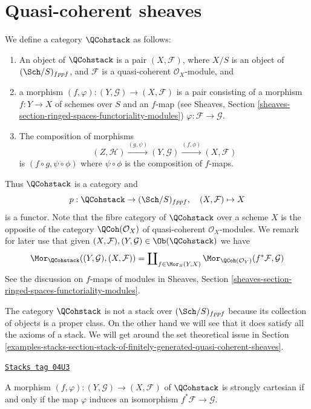 \section{Quasi-coherent sheaves}
\label{examples-stacks-section-stack-of-quasi-coherent-sheaves}
We define a category $\QCohstack$ as follows:
\begin{enumerate}
\item An object of $\QCohstack$ is a pair $(X, \mathcal{F})$,
where $X/S$ is an object of $(\Sch/S)_{fppf}$, and $\mathcal{F}$
is a quasi-coherent $\mathcal{O}_X$-module, and
\item a morphism $(f, \varphi) : (Y, \mathcal{G}) \to (X, \mathcal{F})$
is a pair consisting of a morphism $f : Y \to X$ of schemes over $S$
and an $f$-map (see
Sheaves, Section \ref{sheaves-section-ringed-spaces-functoriality-modules})
$\varphi : \mathcal{F} \to \mathcal{G}$.
\item The composition of morphisms
$$
(Z, \mathcal{H}) \xrightarrow{(g, \psi)}
(Y, \mathcal{G}) \xrightarrow{(f, \phi)} (X, \mathcal{F})
$$
is $(f \circ g, \psi \circ \phi)$ where $\psi \circ \phi$ is
the composition of $f$-maps.
\end{enumerate}
Thus $\QCohstack$ is a category and
$$
p : \QCohstack \to (\Sch/S)_{fppf},
\quad
(X, \mathcal{F}) \mapsto X
$$
is a functor. Note that the fibre category of $\QCohstack$ over
a scheme $X$ is the opposite of the category $\QCoh(\mathcal{O}_X)$
of quasi-coherent $\mathcal{O}_X$-modules.
We remark for later use that given
$(X, \mathcal{F}), (Y, \mathcal{G}) \in \Ob(\QCohstack)$
we have
\begin{equation}
\label{equation-morphisms-qcoh}
\Mor_{\QCohstack}((Y, \mathcal{G}), (X, \mathcal{F}))
=
\coprod\nolimits_{f \in \Mor_S(Y, X)}
\Mor_{\QCoh(\mathcal{O}_Y)}(f^*\mathcal{F}, \mathcal{G})
\end{equation}
See the discussion on $f$-maps of modules in
Sheaves, Section \ref{sheaves-section-ringed-spaces-functoriality-modules}.

\medskip\noindent
The category $\QCohstack$ is not a stack over $(\Sch/S)_{fppf}$
because its collection of objects is a proper class. On the other hand
we will see that it does satisfy all the axioms of a stack. We will
get around the set theoretical issue in
Section \ref{examples-stacks-section-stack-of-finitely-generated-quasi-coherent-sheaves}.

\begin{lemma}
\label{examples-stacks-lemma-quasi-coherent-strongly-cartesian}
\href{https://stacks.math.columbia.edu/tag/04U3}{\texttt{Stacks tag 04U3}}

A morphism $(f, \varphi) : (Y, \mathcal{G}) \to (X, \mathcal{F})$
of $\QCohstack$ is strongly cartesian if and only if the
map $\varphi$ induces an isomorphism $f^*\mathcal{F} \to \mathcal{G}$.
\end{lemma}


